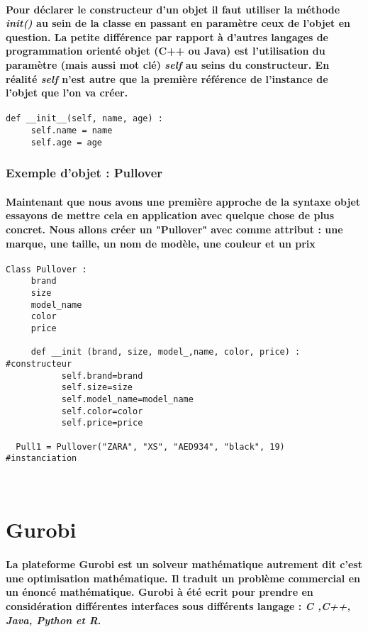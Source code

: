 \documentclass[a4paper, 12pt, twoside]{article}
\begin{document}
\paragraph{Pour déclarer le constructeur d'un objet il faut utiliser la méthode \textit{init()} au sein de la classe en passant en paramètre ceux de l'objet en question. La petite différence par rapport à d'autres langages de programmation orienté objet (C++ ou Java) est l'utilisation du paramètre (mais aussi mot clé) \textit{self} au seins du constructeur. En réalité \textit{self} n'est autre que la première référence de l'instance de l'objet que l'on va créer. } 
\begin{verbatim}
def __init__(self, name, age) :
     self.name = name
     self.age = age
\end{verbatim}
\subsubsection{Exemple d'objet : Pullover}
\paragraph{Maintenant que nous avons une première approche de la syntaxe objet essayons de mettre cela en application avec quelque chose de plus concret. Nous allons créer un "Pullover" avec comme attribut : une marque, une taille, un nom de modèle, une couleur et un prix }
\begin{verbatim}
Class Pullover : 
     brand
     size
     model_name
     color
     price
   
     def __init (brand, size, model_,name, color, price) :       #constructeur
           self.brand=brand
           self.size=size
           self.model_name=model_name
           self.color=color
           self.price=price
          
  Pull1 = Pullover("ZARA", "XS", "AED934", "black", 19)         #instanciation
  
          
\end{verbatim}
\newpage
\section{Gurobi}
\paragraph{La plateforme Gurobi est un solveur mathématique autrement dit c'est une optimisation mathématique. Il traduit un problème commercial en un énoncé mathématique. Gurobi à été ecrit pour prendre en considération différentes interfaces sous différents langage : \textit{C ,C++, Java, Python et R}.}
\end{document}
